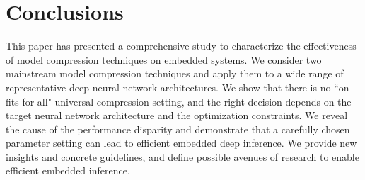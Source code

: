 \section{Conclusions}
This paper has presented a comprehensive study to characterize the effectiveness of model compression techniques on embedded systems. We
consider two mainstream model compression techniques and apply them to a wide range of representative deep neural network architectures. We
show that there is no ``on-fits-for-all" universal compression setting, and the right decision depends on the target neural network
architecture and the optimization constraints. We reveal the cause of the performance disparity and demonstrate that a carefully chosen
parameter setting can lead to efficient embedded deep inference. We provide new insights and concrete guidelines, and define possible
avenues of research to enable efficient embedded inference.
